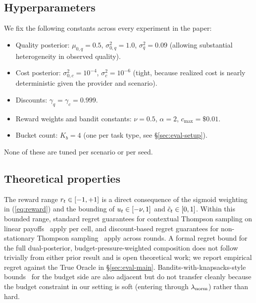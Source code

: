 \subsection{Hyperparameters}
\label{sec:method-hyperparams}

We fix the following constants across every experiment in the paper:
\begin{itemize}
\item Quality posterior: $\mu_{0,q} = 0.5$, $\sigma^2_{0,q} = 1.0$, $\sigma^2_q = 0.09$ (allowing substantial heterogeneity in observed quality).
\item Cost posterior: $\sigma^2_{0,c} = 10^{-4}$, $\sigma^2_c = 10^{-6}$ (tight, because realized cost is nearly deterministic given the provider and scenario).
\item Discounts: $\gamma_q = \gamma_c = 0.999$.
\item Reward weights and bandit constants: $\nu = 0.5$, $\alpha = 2$, $c_{\max} = \$0.01$.
\item Bucket count: $K_b = 4$ (one per task type, see \S\ref{sec:eval-setup}).
\end{itemize}
None of these are tuned per scenario or per seed.

\subsection{Theoretical properties}
\label{sec:method-theory}

The reward range $r_t \in [-1, +1]$ is a direct consequence of the sigmoid weighting in (\ref{eq:reward}) and the bounding of $u_t \in [-\nu, 1]$ and $\tilde c_t \in [0, 1]$. Within this bounded range, standard regret guarantees for contextual Thompson sampling on linear payoffs~\citep{agrawal2013contextualts} apply per cell, and discount-based regret guarantees for non-stationary Thompson sampling~\citep{qi2023dsts} apply across rounds. A formal regret bound for the full dual-posterior, budget-pressure-weighted composition does not follow trivially from either prior result and is open theoretical work; we report empirical regret against the True Oracle in \S\ref{sec:eval-main}. Bandits-with-knapsacks-style bounds~\citep{badanidiyuru2018bandits} for the budget side are also adjacent but do not transfer cleanly because the budget constraint in our setting is soft (entering through $\lambda_{\mathrm{norm}}$) rather than hard.
